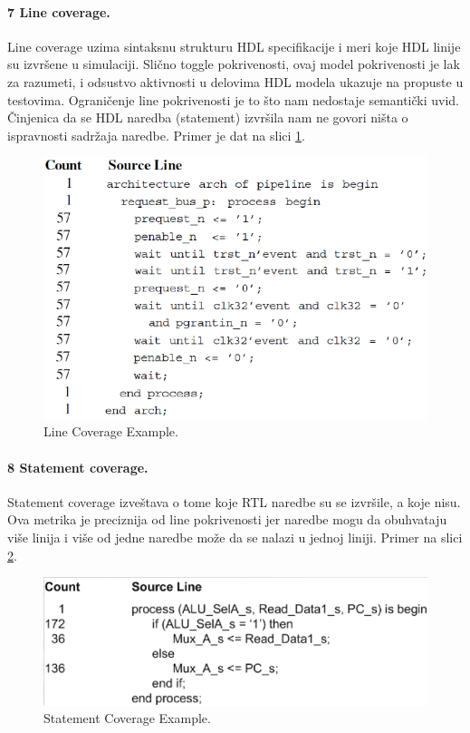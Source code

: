 \documentclass[a4paper, 12pt]{article}
\begin{document}
\paragraph{7 Line coverage.}
\hfill \break
\indent Line coverage uzima sintaksnu strukturu HDL specifikacije i meri koje HDL linije su izvršene u simulaciji. Slično toggle pokrivenosti, ovaj model pokrivenosti je lak za razumeti, i odsustvo aktivnosti u delovima HDL modela ukazuje na propuste u testovima. Ograničenje line pokrivenosti je to što nam nedostaje semantički uvid. Činjenica da se HDL naredba (statement) izvršila nam ne govori ništa o ispravnosti sadržaja naredbe. Primer je dat na slici \ref{img-p10-4}.
\begin{figure}[h!]
\centering
\includegraphics[scale=0.5]{img-p10-4.png}
\caption{Line Coverage Example.}
\label{img-p10-4}
\end{figure}
\paragraph{8 Statement coverage.}
\hfill \break
\indent Statement coverage izveštava o tome koje RTL naredbe su se izvršile, a koje nisu. Ova metrika je preciznija od line pokrivenosti jer naredbe mogu da obuhvataju više linija i više od jedne naredbe može da se nalazi u jednoj liniji. Primer na slici \ref{img-p10-5}.
\begin{figure}[h!]
\centering
\includegraphics[scale=0.5]{img-p10-5.png}
\caption{Statement Coverage Example.}
\label{img-p10-5}
\end{figure}
\end{document}
